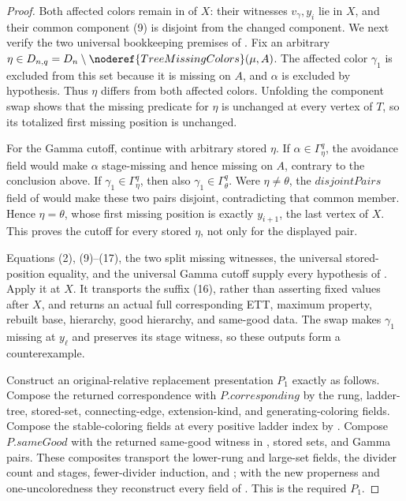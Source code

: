 \begin{proof}
Both affected colors remain in  of \(X\):
their witnesses \(v_\gamma,y_i\) lie in \(X\), and their common component
(9) is disjoint from the changed component.  We next verify the two
universal bookkeeping premises of
.  Fix an arbitrary
\(\eta\in D_{n,q}=D_n\setminus\noderef{TreeMissingColors}(\mu,A)\).
The affected color \(\gamma_1\) is excluded from this set because it is
missing on \(A\), and \(\alpha\) is excluded by hypothesis.  Thus
\(\eta\) differs from both affected colors.  Unfolding the component swap
shows that the missing predicate for \(\eta\) is unchanged at every
vertex of \(T\), so its totalized first missing position is unchanged.

For the Gamma cutoff, continue with arbitrary stored \(\eta\).  If
\(\alpha\in\Gamma^q_\eta\), the avoidance field would make \(\alpha\)
stage-missing and hence missing on \(A\), contrary to the conclusion
above.  If \(\gamma_1\in\Gamma^q_\eta\), then also
\(\gamma_1\in\Gamma^q_\theta\).  Were \(\eta\ne\theta\), the
\(\mathit{disjointPairs}\) field of  would make
these two pairs disjoint, contradicting that common member.  Hence
\(\eta=\theta\), whose first missing position is exactly \(y_{i+1}\),
the last vertex of \(X\).  This proves the cutoff for every stored
\(\eta\), not only for the displayed pair.

Equations (2), (9)--(17), the two split missing witnesses, the universal
stored-position equality, and the universal Gamma cutoff supply every
hypothesis of .  Apply it at
\(X\).  It transports the suffix (16), rather than asserting fixed values
after \(X\), and returns an actual full corresponding ETT, maximum
property, rebuilt base, hierarchy, good hierarchy, and same-good data.
The swap makes \(\gamma_1\) missing at \(y_\ell\) and preserves its stage
witness, so these outputs form a counterexample.

Construct an original-relative replacement presentation \(P_1\) exactly
as follows.  Compose the returned correspondence with
\(P.\mathit{corresponding}\) by the rung, ladder-tree, stored-set,
connecting-edge, extension-kind, and generating-coloring fields.  Compose
the stable-coloring fields at every positive ladder index by
.  Compose \(P.\mathit{sameGood}\) with the returned
same-good witness in , stored sets, and
Gamma pairs.  These composites transport the lower-rung and large-set
fields, the divider count and stages, fewer-divider induction, and
; with the new properness and
one-uncoloredness they reconstruct every field of
.  This is the required
\(P_1\).


\end{proof}
